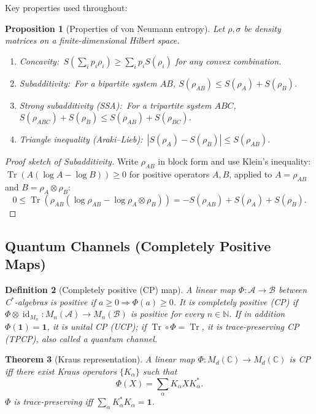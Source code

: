 \documentclass[12pt,a4paper]{article}
\newtheorem{theorem}{Theorem}[section]
\newtheorem{proposition}[theorem]{Proposition}
\newtheorem{definition}[theorem]{Definition}
\DeclareMathOperator{\Tr}{Tr}
\DeclareMathOperator{\id}{id}
\newcommand{\A}{\mathcal{A}}
\newcommand{\B}{\mathcal{B}}
\begin{document}
Key properties used throughout:

\begin{proposition}[Properties of von Neumann entropy]\label{prop:vN}
Let $\rho,\sigma$ be density matrices on a finite-dimensional Hilbert space.
\begin{enumerate}
  \item \emph{Concavity:}\ $S\!\left(\sum_i p_i \rho_i\right)\geq \sum_i p_i
        S(\rho_i)$ for any convex combination.
  \item \emph{Subadditivity:}\ For a bipartite system $AB$,
        $S(\rho_{AB})\leq S(\rho_A)+S(\rho_B)$.
  \item \emph{Strong subadditivity (SSA):}\ For a tripartite system $ABC$,
        $S(\rho_{ABC})+S(\rho_B)\leq S(\rho_{AB})+S(\rho_{BC})$.
  \item \emph{Triangle inequality (Araki--Lieb):}\
        $|S(\rho_A)-S(\rho_B)|\leq S(\rho_{AB})$.
\end{enumerate}
\end{proposition}

\begin{proof}[Proof sketch of Subadditivity]
Write $\rho_{AB}$ in block form and use Klein's inequality:
$\Tr(A(\log A - \log B))\geq 0$ for positive operators $A,B$, applied to
$A=\rho_{AB}$ and $B=\rho_A\otimes\rho_B$:
\[
  0 \leq \Tr(\rho_{AB}(\log\rho_{AB}-\log\rho_A\otimes\rho_B))
       = -S(\rho_{AB}) + S(\rho_A) + S(\rho_B).
\]
\end{proof}

\subsection{Quantum Channels (Completely Positive Maps)}

\begin{definition}[Completely positive (CP) map]
A linear map $\Phi:\A\to\B$ between C$^*$-algebras is \emph{positive} if
$a\geq 0\Rightarrow\Phi(a)\geq 0$.  It is \emph{completely positive (CP)} if
$\Phi\otimes\id_{M_n}:M_n(\A)\to M_n(\B)$ is positive for every $n\in\mathbb{N}$.
If in addition $\Phi(\mathbf{1})=\mathbf{1}$, it is \emph{unital CP (UCP)};
if $\Tr\circ\Phi=\Tr$, it is \emph{trace-preserving CP (TPCP)}, also called a
\emph{quantum channel}.
\end{definition}

\begin{theorem}[Kraus representation]
A linear map $\Phi:M_d(\mathbb{C})\to M_d(\mathbb{C})$ is CP iff there exist
\emph{Kraus operators} $\{K_\alpha\}$ such that
\[
  \Phi(X) = \sum_\alpha K_\alpha X K_\alpha^*.
\]
$\Phi$ is trace-preserving iff $\sum_\alpha K_\alpha^* K_\alpha = \mathbf{1}$.
\end{theorem}
\end{document}
